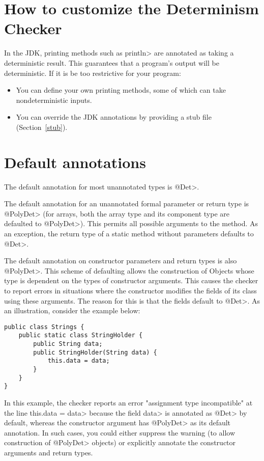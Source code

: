 \section{How to customize the Determinism Checker\label{determinism-customization}}

In the JDK, printing methods such as \<println> are annotated as taking a
deterministic result.  This guarantees that a program's output will be
deterministic.  If it is be too restrictive for your program:
\begin{itemize}
\item
  You can define your own printing methods, some of which can take
  nondeterministic inputs.
\item
  You can override the JDK annotations by providing a stub file
  (Section~\ref{stub}).
\end{itemize}


\section{Default annotations\label{determinism-defaults}}

The default annotation for most unannotated types is \<@Det>.

The default annotation for an unannotated formal parameter or return type
is \<@PolyDet> (for arrays, both the array type and its component type
are defaulted to \<@PolyDet>).
This permits all possible arguments to the method.
As an exception, the return type of a static method without parameters
defaults to \<@Det>.

The default annotation on constructor parameters and return types is also \<@PolyDet>.
This scheme of defaulting allows the construction of Objects whose type
is dependent on the types of constructor arguments. This causes the checker
to report errors in situations where the constructor modifies the fields of its class
using these arguments. The reason for this is that the fields default to \<@Det>.
As an illustration, consider the example below:

\begin{Verbatim}
public class Strings {
    public static class StringHolder {
        public String data;
        public StringHolder(String data) {
            this.data = data;
        }
    }
}
\end{Verbatim}

In this example, the checker reports an error "assignment type incompatible"
at the line \<this.data = data> because the field \<data> is annotated as
\<@Det> by default, whereas the constructor argument has \<@PolyDet>
as its default annotation. In such cases, you could either suppress the warning
(to allow construction of \<@PolyDet> objects) or explicitly annotate the
constructor arguments and return types.

